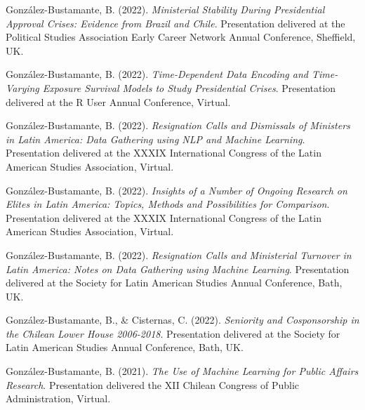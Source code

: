 \begin{publications}
\begin{benumerate}{77}
\item{\small González-Bustamante, B. (2022). {\itshape Ministerial Stability During Presidential Approval Crises: Evidence from Brazil and Chile}. Presentation delivered at the Political Studies Association Early Career Network Annual Conference, Sheffield, UK.}\vspace{1mm}

\item{\small González-Bustamante, B. (2022). {\itshape Time-Dependent Data Encoding and Time-Varying Exposure Survival Models to Study Presidential Crises}. Presentation delivered at the R User Annual Conference, Virtual.}\vspace{1mm}

\item{\small González-Bustamante, B. (2022). {\itshape Resignation Calls and Dismissals of Ministers in Latin America: Data Gathering using NLP and Machine Learning}. Presentation delivered at the XXXIX International Congress of the Latin American Studies Association, Virtual.}\vspace{1mm}

\item{\small González-Bustamante, B. (2022). {\itshape Insights of a Number of Ongoing Research on Elites in Latin America: Topics, Methods and Possibilities for Comparison}. Presentation delivered at the XXXIX International Congress of the Latin American Studies Association, Virtual.}\vspace{1mm}

\item{\small González-Bustamante, B. (2022). {\itshape Resignation Calls and Ministerial Turnover in Latin America: Notes on Data Gathering using Machine Learning}. Presentation delivered at the Society for Latin American Studies Annual Conference, Bath, UK.}\vspace{1mm}

\item{\small González-Bustamante, B., \& Cisternas, C. (2022). {\itshape Seniority and Cosponsorship in the Chilean Lower House 2006-2018}. Presentation delivered at the Society for Latin American Studies Annual Conference, Bath, UK.}\vspace{1mm}

\item{\small González-Bustamante, B. (2021). {\itshape The Use of Machine Learning for Public Affairs Research}. Presentation delivered the XII Chilean Congress of Public Administration, Virtual.}\vspace{1mm}


\end{benumerate}
\end{publications}
